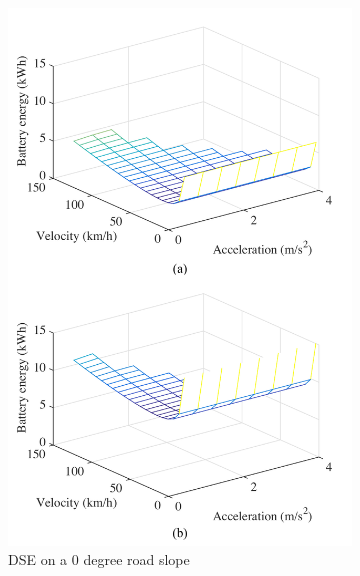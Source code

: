 \documentclass{IEEEtran}
\begin{document}
\begin{figure}   %
\centering
	\begin{subfigure}{0.5\textwidth}
	\includegraphics[width=\hsize]{Figures/Design_space_exploration_top.pdf}
	\caption{DSE on a 0 degree road slope}
	\label{fig:DSE_0_slope}
	\end{subfigure}
~
	\begin{subfigure}{0.5\textwidth}

\end{subfigure}
\end{figure}
\end{document}
